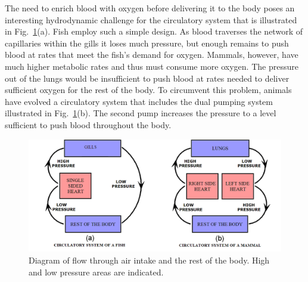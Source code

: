 The need to enrich blood with oxygen before delivering it to the body poses an interesting hydrodynamic challenge for the circulatory system that is illustrated in Fig.~\ref{Fig2-2}(a). Fish employ such a simple design. As blood traverses the network of capillaries within the gills it loses much pressure, but enough remains to push blood at rates that meet the fish’s demand for oxygen. Mammals, however, have much higher metabolic rates and thus must consume more oxygen. The pressure out of the lungs would be insufficient to push blood at rates needed to deliver sufficient oxygen for the rest of the body. To circumvent this problem, animals have evolved a circulatory system that includes the dual pumping system illustrated in Fig.~\ref{Fig2-2}(b). The second pump increases the pressure to a level sufficient to push blood throughout the body. 
\begin{figure}[htb]
	\centering
	\includegraphics[width=\textwidth]{./figures/Topic2/Fig2-2.png}
	\caption{Diagram of flow through air intake and the rest of the body. High and low pressure areas are indicated.}
	\label{Fig2-2}
\end{figure}

